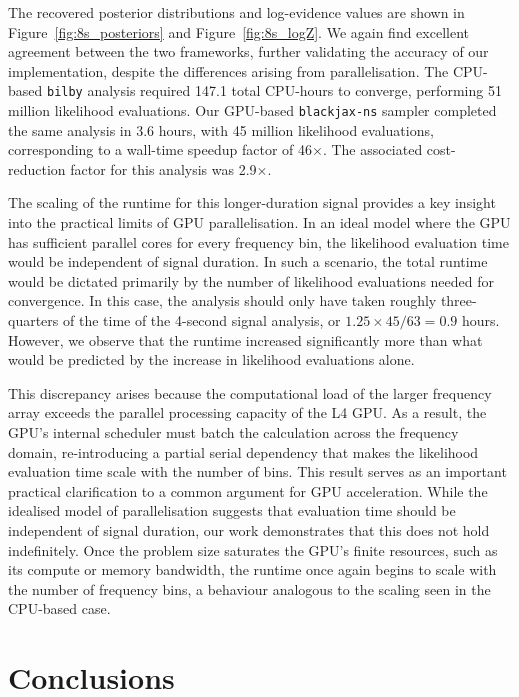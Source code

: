 \documentclass[fleqn,usenatbib]{mnras}
\begin{document}
The recovered posterior distributions and log-evidence values are shown
in Figure~\ref{fig:8s_posteriors} and Figure~\ref{fig:8s_logZ}. We again
find excellent agreement between the two frameworks, further validating
the accuracy of our implementation, despite the differences arising from 
parallelisation. The CPU-based \texttt{bilby} analysis required 147.1 total CPU-hours to
converge, performing 51 million likelihood evaluations. Our GPU-based
\texttt{blackjax-ns} sampler completed the same analysis in 3.6 hours, with 45 million likelihood evaluations,
corresponding to a wall-time speedup factor of 46$\times$. 
The associated cost-reduction factor for this
analysis was 2.9$\times$. 

The scaling of the runtime for this longer-duration signal provides a
key insight into the practical limits of GPU parallelisation. In an
ideal model where the GPU has sufficient parallel cores for every
frequency bin, the likelihood evaluation time would be independent of
signal duration. In such a scenario, the total runtime would be dictated
primarily by the number of likelihood evaluations needed for convergence.
In this case, the analysis should only have taken roughly three-quarters
of the time of the 4-second signal analysis, or $1.25 \times 45/63 = 0.9$ hours. 
However, we observe that the runtime increased significantly more than
what would be predicted by the increase in likelihood evaluations alone.


This discrepancy arises because the computational load of the larger
frequency array exceeds the parallel processing capacity of the L4 GPU.
As a result, the GPU's internal scheduler must batch the calculation
across the frequency domain, re-introducing a partial serial dependency
that makes the likelihood evaluation time scale with the number of bins.
This result serves as an important practical clarification to a common
argument for GPU acceleration. While the idealised model of
parallelisation suggests that evaluation time should be independent of
signal duration, our work demonstrates that this does not hold
indefinitely. Once the problem size saturates the GPU's finite
resources, such as its compute or memory bandwidth, the runtime once
again begins to scale with the number of frequency bins, a behaviour
analogous to the scaling seen in the CPU-based case.


\section{Conclusions}
\label{sec:conclusions}
\end{document}
